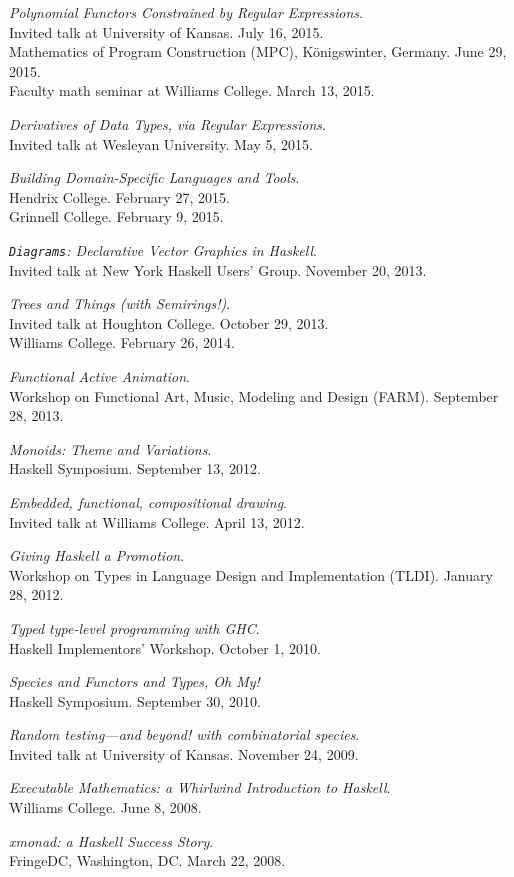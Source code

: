 \documentclass[12pt]{article}
\newcommand{\cvitem}{\par\hangpara{2em}{1}}
\begin{document}
\cvitem \emph{Polynomial Functors Constrained by Regular
    Expressions}. \\ Invited talk at University of Kansas. July 16, 2015.
    \\ Mathematics of Program Construction (MPC),
    K\"onigswinter, Germany. June 29, 2015.
    \\ Faculty math seminar at Williams College. March 13, 2015.
\cvitem \emph{Derivatives of Data Types, via Regular
    Expressions}. \\ Invited talk at Wesleyan University. May 5, 2015.
\cvitem \emph{Building Domain-Specific Languages and Tools}. \\
    Hendrix College. February 27, 2015. \\
    Grinnell College. February 9, 2015.
\cvitem \emph{\texttt{Diagrams}: Declarative Vector Graphics in
    Haskell}. \\ Invited talk at New York Haskell Users' Group. November
    20, 2013.
\cvitem \emph{Trees and Things (with Semirings!)}. \\ Invited talk at Houghton
    College. October 29, 2013. \\
    Williams College. February 26, 2014.
\cvitem \emph{Functional Active Animation}. \\ Workshop on Functional
    Art, Music, Modeling and Design (FARM).  September 28, 2013.
\cvitem \emph{Monoids: Theme and Variations}. \\ Haskell Symposium.
    September 13, 2012.
\cvitem \emph{Embedded, functional, compositional drawing}. \\ Invited
    talk at Williams College. April 13, 2012.
\cvitem \emph{Giving Haskell a Promotion}. \\ Workshop on Types in
    Language Design and Implementation (TLDI). January 28, 2012.
\cvitem \emph{Typed type-level programming with GHC}. \\ Haskell
    Implementors' Workshop. October 1, 2010.
\cvitem \emph{Species and Functors and Types, Oh My!} \\ Haskell
    Symposium. September 30, 2010.
\cvitem \emph{Random testing---and beyond! with combinatorial
    species}. \\ Invited talk at University of Kansas.  November 24, 2009.
\cvitem \emph{Executable Mathematics: a Whirlwind Introduction to
    Haskell}. \\ Williams College.  June 8, 2008.
\cvitem \emph{xmonad: a Haskell Success Story}. \\ FringeDC, Washington,
    DC. March 22, 2008.
\end{document}
